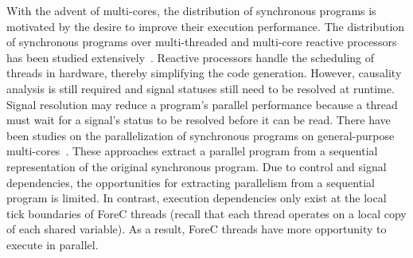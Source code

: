 With the advent of multi-cores, the distribution of
synchronous programs is motivated by the desire to improve
their execution performance. The distribution of synchronous
programs over multi-threaded and multi-core reactive processors
has been studied extensively~\cite{LiH12,YuanAYRS09,DayaratneRS06,SalcicHRB06,timed_esterel_distribution_emperor}. 
Reactive processors handle the scheduling of threads
in hardware, thereby simplifying the code generation. However, 
causality analysis is still required and signal statuses 
still need to be resolved at runtime. Signal resolution may 
reduce a program's parallel performance because a thread 
must wait for a signal's status to be resolved before it 
can be read. There have been studies on the parallelization 
of synchronous programs on general-purpose 
multi-cores~\cite{wcrt_esterel_multicores,YuanYR11,multiprocessing_openmp_synchronous}.
These approaches extract a parallel program from a 
sequential representation of the original synchronous program. 
Due to control and signal dependencies, the opportunities 
for extracting parallelism from a sequential program is
limited. In contrast, execution dependencies only exist
at the local tick boundaries of ForeC threads (recall that each
thread operates on a local copy of each shared variable). As a result, ForeC 
threads have more opportunity to execute in parallel.



